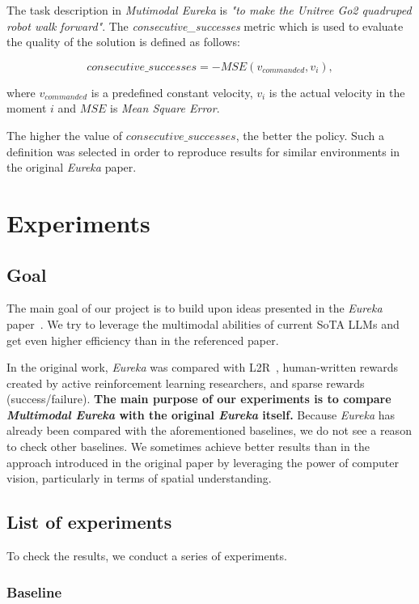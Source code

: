 \documentclass[10pt,twocolumn]{article}
\begin{document}
The task description in \textit{Mutimodal Eureka} is \emph{"to make the Unitree Go2 quadruped robot walk forward"}. The \textit{consecutive\_successes} metric which is used to evaluate the quality of the solution is defined as follows:

$$
consecutive\_successes = -MSE(v_{commanded}, v_i),
$$

where $v_{commanded}$ is a predefined constant velocity, $v_i$ is the actual velocity in the moment $i$ and $MSE$ is \textit{Mean Square Error}.

The higher the value of $consecutive\_successes$, the better the policy. Such a definition was selected in order to reproduce results for similar environments in the original \textit{Eureka} paper.

\section{Experiments}

\subsection{Goal}

The main goal of our project is to build upon ideas presented in the \textit{Eureka} paper~\cite{eureka}. We try to leverage the multimodal abilities of current SoTA LLMs and get even higher efficiency than in the referenced paper.

In the original work, \textit{Eureka} was compared with L2R~\cite{l2r}, human-written rewards created by active reinforcement learning researchers, and sparse rewards (success/failure). \textbf{The main purpose of our experiments is to compare \textit{Multimodal Eureka} with the original \textit{Eureka} itself.} Because \textit{Eureka} has already been compared with the aforementioned baselines, we do not see a reason to check other baselines. We sometimes achieve better results than in the approach introduced in the original paper by leveraging the power of computer vision, particularly in terms of spatial understanding.

\subsection{List of experiments}

To check the results, we conduct a series of experiments.

\subsubsection{Baseline}
\end{document}
